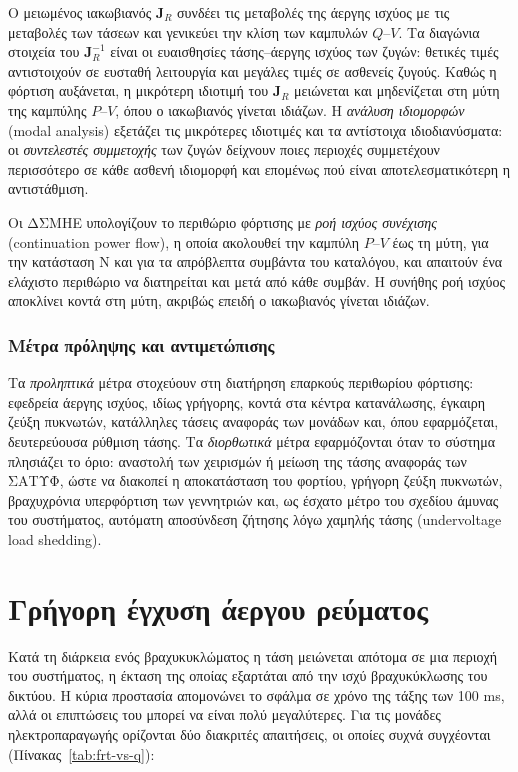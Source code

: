 Ο μειωμένος ιακωβιανός $\mathbf{J}_R$ συνδέει τις μεταβολές της άεργης ισχύος με τις
μεταβολές των τάσεων και γενικεύει την κλίση των καμπυλών $Q$--$V$. Τα διαγώνια στοιχεία του
$\mathbf{J}_R^{-1}$ είναι οι ευαισθησίες τάσης--άεργης ισχύος των ζυγών: θετικές τιμές
αντιστοιχούν σε ευσταθή λειτουργία και μεγάλες τιμές σε ασθενείς ζυγούς. Καθώς η φόρτιση
αυξάνεται, η μικρότερη ιδιοτιμή του $\mathbf{J}_R$ μειώνεται και μηδενίζεται στη μύτη της
καμπύλης $P$--$V$, όπου ο ιακωβιανός γίνεται ιδιάζων. Η \emph{ανάλυση ιδιομορφών} (modal
analysis) εξετάζει τις μικρότερες ιδιοτιμές και τα αντίστοιχα ιδιοδιανύσματα: οι
\emph{συντελεστές συμμετοχής} των ζυγών δείχνουν ποιες περιοχές συμμετέχουν περισσότερο σε
κάθε ασθενή ιδιομορφή και επομένως πού είναι αποτελεσματικότερη η αντιστάθμιση.

Οι ΔΣΜΗΕ υπολογίζουν το περιθώριο φόρτισης με \emph{ροή ισχύος συνέχισης} (continuation
power flow), η οποία ακολουθεί την καμπύλη $P$--$V$ έως τη μύτη, για την κατάσταση N και για τα
απρόβλεπτα συμβάντα του καταλόγου, και απαιτούν ένα ελάχιστο περιθώριο να διατηρείται και μετά
από κάθε συμβάν. Η συνήθης ροή ισχύος αποκλίνει κοντά στη μύτη, ακριβώς επειδή ο ιακωβιανός
γίνεται ιδιάζων.

\subsubsection{Μέτρα πρόληψης και αντιμετώπισης}

Τα \emph{προληπτικά} μέτρα στοχεύουν στη διατήρηση επαρκούς περιθωρίου φόρτισης: εφεδρεία
άεργης ισχύος, ιδίως γρήγορης, κοντά στα κέντρα κατανάλωσης, έγκαιρη ζεύξη πυκνωτών, κατάλληλες
τάσεις αναφοράς των μονάδων και, όπου εφαρμόζεται, δευτερεύουσα ρύθμιση τάσης. Τα
\emph{διορθωτικά} μέτρα εφαρμόζονται όταν το σύστημα πλησιάζει το όριο: αναστολή των χειρισμών
ή μείωση της τάσης αναφοράς των ΣΑΤΥΦ, ώστε να διακοπεί η αποκατάσταση του
φορτίου, γρήγορη ζεύξη πυκνωτών, βραχυχρόνια υπερφόρτιση των γεννητριών και, ως έσχατο μέτρο του
σχεδίου άμυνας του συστήματος, αυτόματη αποσύνδεση ζήτησης λόγω χαμηλής τάσης (undervoltage
load shedding).

\section{Γρήγορη έγχυση άεργου ρεύματος}
\label{sec:frt}

Κατά τη διάρκεια ενός βραχυκυκλώματος η τάση μειώνεται απότομα σε μια περιοχή του συστήματος,
η έκταση της οποίας εξαρτάται από την ισχύ βραχυκύκλωσης του δικτύου. Η κύρια προστασία
απομονώνει το σφάλμα σε χρόνο της τάξης των 100 ms, αλλά οι επιπτώσεις του μπορεί να είναι
πολύ μεγαλύτερες. Για τις μονάδες ηλεκτροπαραγωγής ορίζονται δύο διακριτές απαιτήσεις, οι
οποίες συχνά συγχέονται (Πίνακας~\ref{tab:frt-vs-q}):

